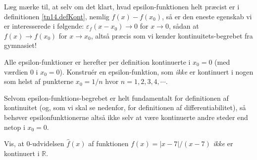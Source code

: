 \begin{aha}
Læg mærke til, at selv om det klart, hvad epsilon-funktionen helt præcist er i definitionen \ref{tn14.defKont}, nemlig $f(x) - f(x_{0})$, så er den eneste egenskab vi er interesserede i følgende:
$\varepsilon_{f}(x - x_{0}) \to 0$ for $ x \to {0}$, sådan at $f(x) \to f(x_{0})$ for $x \to x_{0}$,
altså præcis som vi kender kontinuitets-begrebet fra gymnasiet!
\end{aha}

\begin{exercise} \label{tn14.exercNonKontEps}
Alle epsilon-funktioner er herefter per definition kontinuerte i $x_{0} = 0$ (med værdien $0$ i $x_{0}=0$). Konstru\'{e}r en epsilon-funktion, som \emph{ikke} er kontinuert i nogen som helst af punkterne $x_{0} = 1/n$ hvor $n = 1, 2, 3, 4, \cdots$.
\end{exercise}

\begin{aha}
Selvom epsilon-funktions-begrebet er helt fundamentalt for definitionen af kontinuitet (og, som vi skal se nedenfor, for definitionen af differentiabilitet), så behøver epsilonfunktionerne altså ikke selv at være kontinuerte andre steder end netop i $x_{0}=0$.
\end{aha}

\begin{exercise} \label{tn14.exercNumDiv}
Vis, at $0$-udvidelsen $\widehat{f}(x)$ af funktionen $f(x) = |x-7|/(x-7)$ \emph{ikke} er kontinuert i $\mathbb{R}$.
\end{exercise}



